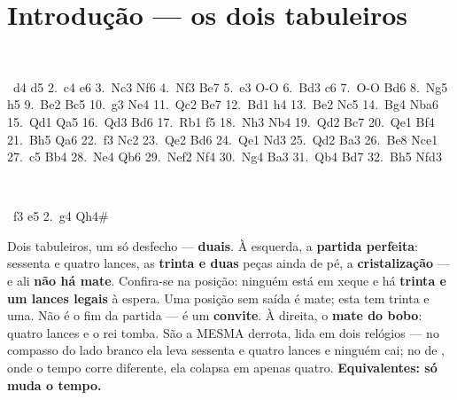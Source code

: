 \documentclass[livro.tex]{subfiles}
\begin{document}
\chapter*{Introdução --- os dois tabuleiros}

\begin{center}
\begin{minipage}[t]{0.47\linewidth}\centering
\newgame
{}
\showboard\\[2mm]
{\scriptsize\raggedright{}~d4 d5 {\color{black!45}2.}~c4 e6 {\color{black!45}3.}~Nc3 Nf6 {\color{black!45}4.}~Nf3 Be7 {\color{black!45}5.}~e3 O-O {\color{black!45}6.}~Bd3 c6 {\color{black!45}7.}~O-O Bd6 {\color{black!45}8.}~Ng5 h5 {\color{black!45}9.}~Be2 Bc5 {\color{black!45}10.}~g3 Ne4 {\color{black!45}11.}~Qc2 Be7 {\color{black!45}12.}~Bd1 h4 {\color{black!45}13.}~Be2 Nc5 {\color{black!45}14.}~Bg4 Nba6 {\color{black!45}15.}~Qd1 Qa5 {\color{black!45}16.}~Qd3 Bd6 {\color{black!45}17.}~Rb1 f5 {\color{black!45}18.}~Nh3 Nb4 {\color{black!45}19.}~Qd2 Bc7 {\color{black!45}20.}~Qe1 Bf4 {\color{black!45}21.}~Bh5 Qa6 {\color{black!45}22.}~f3 Nc2 {\color{black!45}23.}~Qe2 Bd6 {\color{black!45}24.}~Qe1 Nd3 {\color{black!45}25.}~Qd2 Ba3 {\color{black!45}26.}~Be8 Nce1 {\color{black!45}27.}~c5 Bb4 {\color{black!45}28.}~Ne4 Qb6 {\color{black!45}29.}~Nef2 Nf4 {\color{black!45}30.}~Ng4 Ba3 {\color{black!45}31.}~Qb4 Bd7 {\color{black!45}32.}~Bh5 Nfd3\par}
\end{minipage}\hfill
\begin{minipage}[t]{0.47\linewidth}\centering
\newgame
{}
\showboard\\[2mm]
{\scriptsize\raggedright{}~f3 e5 {\color{black!45}2.}~g4 Qh4\#\par}
\end{minipage}
\end{center}

\noindent Dois tabuleiros, um só desfecho --- \textbf{duais}. À esquerda, a \textbf{partida
perfeita}: sessenta e quatro lances, as \textbf{trinta e duas} peças ainda de pé, a
\textbf{cristalização} --- e ali \textbf{não há mate}. Confira-se na posição: ninguém está
em xeque e há \textbf{trinta e um lances legais} à espera. Uma posição sem saída é mate;
esta tem trinta e uma. Não é o fim da partida --- é um \textbf{convite}. À direita, o \textbf{mate do bobo}:
quatro lances e o rei tomba. São a MESMA derrota, lida em dois relógios --- no compasso
do lado branco ela leva sessenta e quatro lances e ninguém cai; no de \Ven , onde o tempo
corre diferente, ela colapsa em apenas quatro. \textbf{Equivalentes: só muda o tempo.}
\end{document}
